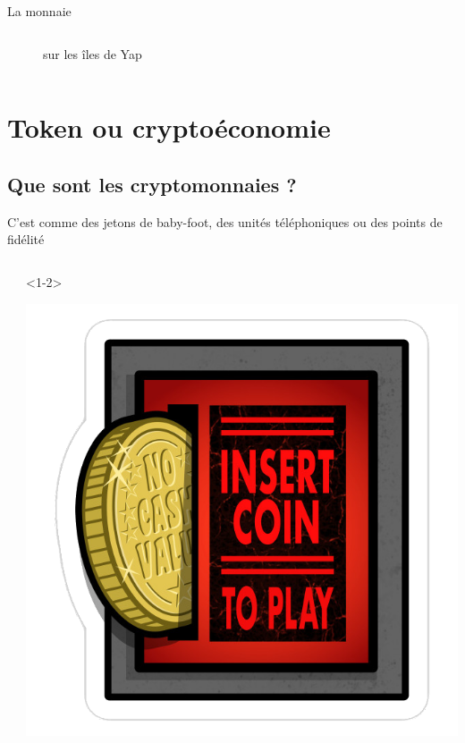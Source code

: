 \documentclass[presentation]{beamer}
\begin{document}
\begin{frame}[label={sec:orgbc2cf2d}]{La monnaie}
\begin{columns}
\begin{column}{0.55\columnwidth}
\begin{block}{}
{\begin{figure}[htbp]
\caption{sur les îles de Yap}
\end{figure}
}
\end{block}
\end{column}
\end{columns}
\end{frame}

\section{Token ou cryptoéconomie}
\label{sec:org61dea7e}
\subsection{Que sont les  cryptomonnaies ?}
\label{sec:orgae42cca}
\begin{frame}[label={sec:org4728df8}]{C'est comme des jetons de baby-foot, des unités téléphoniques ou des points de fidélité}
\begin{columns}
\begin{column}{0.38\columnwidth}
\begin{block}{}
\end{block}
\end{column}
\begin{column}{0.38\columnwidth}
\begin{block}<1-2>{}
\begin{center}
\includegraphics[width=\textwidth]{./Pictures/arcade_token.png}

\end{center}
\end{block}
\end{column}
\end{columns}
\end{frame}
\end{document}
